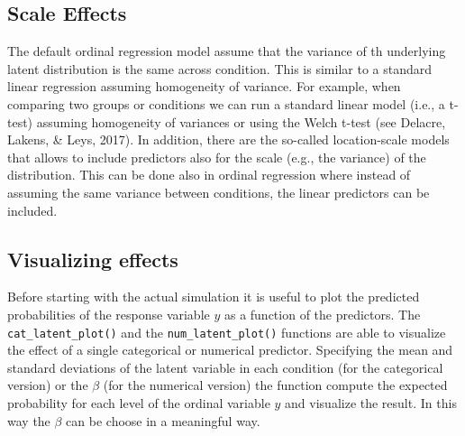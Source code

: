 \documentclass[
  man,floatsintext]{apa6}
\begin{document}
\subsection{Scale Effects}\label{scale-effects}

The default ordinal regression model assume that the variance of th underlying latent distribution is the same across condition. This is similar to a standard linear regression assuming homogeneity of variance. For example, when comparing two groups or conditions we can run a standard linear model (i.e., a t-test) assuming homogeneity of variances or using the Welch t-test (see Delacre, Lakens, \& Leys, 2017). In addition, there are the so-called location-scale models that allows to include predictors also for the scale (e.g., the variance) of the distribution. This can be done also in ordinal regression where instead of assuming the same variance between conditions, the linear predictors can be included.

\subsection{Visualizing effects}\label{visualizing-effects}

Before starting with the actual simulation it is useful to plot the predicted probabilities of the response variable \(y\) as a function of the predictors. The \texttt{cat\_latent\_plot()} and the \texttt{num\_latent\_plot()} functions are able to visualize the effect of a single categorical or numerical predictor. Specifying the mean and standard deviations of the latent variable in each condition (for the categorical version) or the \(\beta\) (for the numerical version) the function compute the expected probability for each level of the ordinal variable \(y\) and visualize the result. In this way the \(\beta\) can be choose in a meaningful way.
\end{document}
